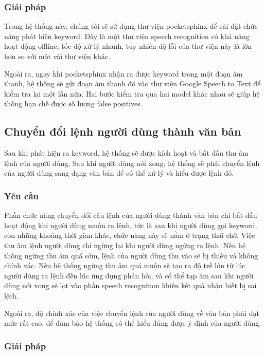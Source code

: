 \subsubsection{Giải pháp}

Trong hệ thống này, chúng tôi sẽ sử dụng thư viện pocketsphinx để cài đặt chức năng phát hiện keyword. Đây là một thư viện speech recognition có khả năng hoạt động offline, tốc độ xử lý nhanh, tuy nhiên độ lỗi của thư viện này là lớn hơn so với một vài thư viện khác.

Ngoài ra, ngay khi pocketsphinx nhận ra được keyword trong một đoạn âm thanh, hệ thống sẽ gửi đoạn âm thanh đó vào thư viện Google Speech to Text để kiểm tra lại một lần nữa. Hai bước kiểm tra qua hai model khác nhau sẽ giúp hệ thống hạn chế được số lượng false positives.

\subsection{Chuyển đổi lệnh người dùng thành văn bản}

Sau khi phát hiện ra keyword, hệ thống sẽ được kích hoạt và bắt đầu thu âm lệnh của người dùng. Sau khi người dùng nói xong, hệ thống sẽ phải chuyển lệnh của người dùng sang dạng văn bản để có thể xử lý và hiểu được lệnh đó.

\subsubsection{Yêu cầu}

Phần chức năng chuyển đổi câu lệnh của người dùng thành văn bản chỉ bắt đầu hoạt động khi người dùng muốn ra lệnh, tức là sau khi người dùng gọi keyword, còn những khoảng thời gian khác, chức năng này sẽ nằm ở trạng thái chờ. Việc thu âm lệnh người dùng chỉ ngừng lại khi người dùng ngừng ra lệnh. Nếu hệ thống ngừng thu âm quá sớm, lệnh của người dùng thu vào sẽ bị thiếu và không chính xác. Nếu hệ thống ngừng thu âm quá muộn sẽ tạo ra độ trễ lớn từ lúc người dùng ra lệnh đến lúc ứng dụng phản hồi, và có thể tạp âm sau khi người dùng nói xong sẽ lọt vào phần speech recognition khiến kết quả nhận biết bị sai lệch.

Ngoài ra, độ chính xác của việc chuyển lệnh của người dùng về văn bản phải đạt mức rất cao, để đảm bảo hệ thống có thể hiểu đúng được ý định của người dùng.

\subsubsection{Giải pháp}


